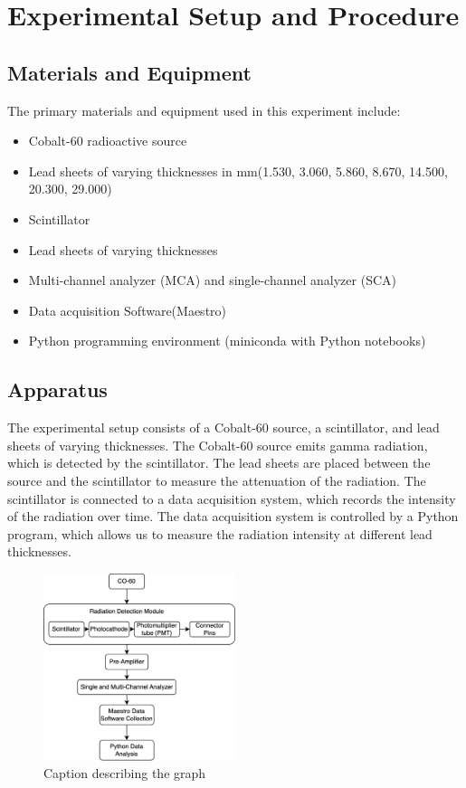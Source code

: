 \documentclass[12pt]{article}
\begin{document}
    \section{Experimental Setup and Procedure}
        \subsection{Materials and Equipment}
            The primary materials and equipment used in this experiment include:
            \begin{itemize}
                \item Cobalt-60 radioactive source
                \item Lead sheets of varying thicknesses in mm(1.530, 3.060, 5.860, 8.670, 14.500, 20.300, 29.000) 
                \item Scintillator
                \item Lead sheets of varying thicknesses
                \item Multi-channel analyzer (MCA) and single-channel analyzer (SCA)
                \item Data acquisition Software(Maestro)
                \item Python programming environment (miniconda with Python notebooks)
            \end{itemize}
            
        \subsection{Apparatus}
            The experimental setup consists of a Cobalt-60 source, a scintillator, and lead sheets of varying thicknesses. 
            The Cobalt-60 source emits gamma radiation, which is detected by the scintillator. 
            The lead sheets are placed between the source and the scintillator to measure the attenuation of the radiation. 
            The scintillator is connected to a data acquisition system, which records the intensity of the radiation over time. 
            The data acquisition system is controlled by a Python program, which allows us to measure the radiation intensity at different lead thicknesses.
            
            \begin{figure}[!htb]
                \centering
                \includegraphics[width=0.5\textwidth]{./img/other/Lab1 Apparatus.png}
                \caption{Caption describing the graph}
                \label{fig:graph1}
            \end{figure}
\end{document}
